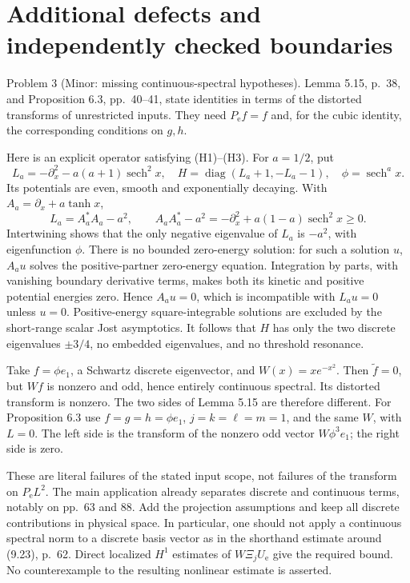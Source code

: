 \documentclass[10pt]{article}
\begin{document}
\section*{Additional defects and independently checked boundaries}
Problem 3 (Minor: missing continuous-spectral hypotheses).  Lemma 5.15, p. 38, and Proposition 6.3, pp. 40–41, state identities in terms of the distorted transforms of unrestricted inputs. They need \(P_{\mathrm e}f=f\) and, for the cubic identity, the corresponding conditions on \(g,h\).\par
Here is an explicit operator satisfying (H1)–(H3). For \(a=1/2\), put \[L_a=-\partial_x^2-a(a+1)\mathop{\mathrm{sech}}^2x,\quad
 H=\mathop{\mathrm{diag}}(L_a+1,-L_a-1),\quad \phi=\mathop{\mathrm{sech}}^a x.\] Its potentials are even, smooth and exponentially decaying. With \(A_a=\partial_x+a\tanh x\), \[L_a=A_a^*A_a-a^2,\qquad
 A_aA_a^*-a^2=-\partial_x^2+a(1-a)\mathop{\mathrm{sech}}^2x\ge0.\] Intertwining shows that the only negative eigenvalue of \(L_a\) is \(-a^2\), with eigenfunction \(\phi\). There is no bounded zero-energy solution: for such a solution \(u\), \(A_au\) solves the positive-partner zero-energy equation. Integration by parts, with vanishing boundary derivative terms, makes both its kinetic and positive potential energies zero. Hence \(A_au=0\), which is incompatible with \(L_au=0\) unless \(u=0\). Positive-energy square-integrable solutions are excluded by the short-range scalar Jost asymptotics. It follows that \(H\) has only the two discrete eigenvalues \(\pm3/4\), no embedded eigenvalues, and no threshold resonance.\par
Take \(f=\phi e_1\), a Schwartz discrete eigenvector, and \(W(x)=xe^{-x^2}\). Then \(\widetilde f=0\), but \(Wf\) is nonzero and odd, hence entirely continuous spectral. Its distorted transform is nonzero. The two sides of Lemma 5.15 are therefore different. For Proposition 6.3 use \(f=g=h=\phi e_1\), \(j=k=\ell=m=1\), and the same \(W\), with \(L=0\). The left side is the transform of the nonzero odd vector \(W\phi^3e_1\); the right side is zero.\par
These are literal failures of the stated input scope, not failures of the transform on \(P_{\mathrm e}L^2\). The main application already separates discrete and continuous terms, notably on pp. 63 and 88. Add the projection assumptions and keep all discrete contributions in physical space. In particular, one should not apply a continuous spectral norm to a discrete basis vector as in the shorthand estimate around (9.23), p. 62. Direct localized \(H^1\) estimates of \(W\Xi_jU_{\mathrm e}\) give the required bound. No counterexample to the resulting nonlinear estimate is asserted.\par
\end{document}
